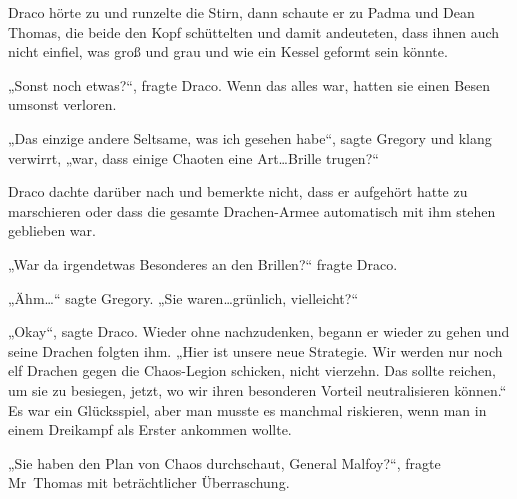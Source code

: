 Draco hörte zu und runzelte die Stirn, dann schaute er zu Padma und Dean Thomas, die beide den Kopf schüttelten und damit andeuteten, dass ihnen auch nicht einfiel, was groß und grau und wie ein Kessel geformt sein könnte.

„Sonst noch etwas?“, fragte Draco. Wenn das alles war, hatten sie einen Besen umsonst verloren.

„Das einzige andere Seltsame, was ich gesehen habe“, sagte Gregory und klang verwirrt, „war, dass einige Chaoten eine Art…Brille trugen?“

Draco dachte darüber nach und bemerkte nicht, dass er aufgehört hatte zu marschieren oder dass die gesamte Drachen-Armee automatisch mit ihm stehen geblieben war.

„War da irgendetwas Besonderes an den Brillen?“ fragte Draco.

„Ähm…“ sagte Gregory. „Sie waren…grünlich, vielleicht?“

„Okay“, sagte Draco. Wieder ohne nachzudenken, begann er wieder zu gehen und seine Drachen folgten ihm. „Hier ist unsere neue Strategie. Wir werden nur noch elf Drachen gegen die Chaos-Legion schicken, nicht vierzehn. Das sollte reichen, um sie zu besiegen, jetzt, wo wir ihren besonderen Vorteil neutralisieren können.“ Es war ein Glücksspiel, aber man musste es manchmal riskieren, wenn man in einem Dreikampf als Erster ankommen wollte.

„Sie haben den Plan von Chaos durchschaut, General Malfoy?“, fragte Mr~Thomas mit beträchtlicher Überraschung.

